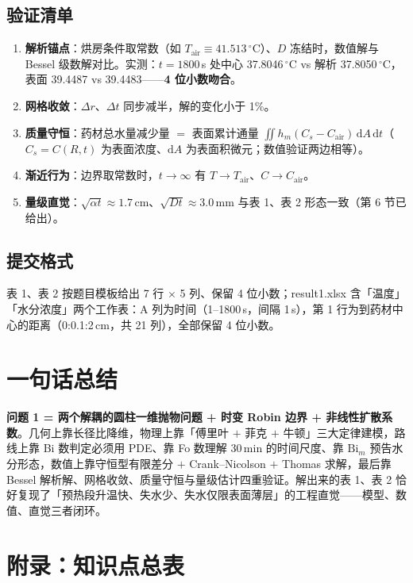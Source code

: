 \documentclass[12pt,a4paper]{ctexart}
\begin{document}
\subsection{验证清单}

\begin{enumerate}[leftmargin=2.5em]
\item \textbf{解析锚点}：烘房条件取常数（如 $T_{\mathrm{air}}\equiv41.513\,^\circ$C）、$D$ 冻结时，数值解与 Bessel 级数解对比。实测：$t=1800$\,s 处中心 37.8046\,$^\circ$C vs 解析 37.8050\,$^\circ$C，表面 39.4487 vs 39.4483——\textbf{4 位小数吻合}。
\item \textbf{网格收敛}：$\Delta r$、$\Delta t$ 同步减半，解的变化小于 1\%。
\item \textbf{质量守恒}：药材总水量减少量 $=$ 表面累计通量 $\iint h_m(C_s-C_{\mathrm{air}})\,\mathrm{d}A\,\mathrm{d}t$（$C_s=C(R,t)$ 为表面浓度、$\mathrm{d}A$ 为表面积微元；数值验证两边相等）。
\item \textbf{渐近行为}：边界取常数时，$t\to\infty$ 有 $T\to T_{\mathrm{air}}$、$C\to C_{\mathrm{air}}$。
\item \textbf{量级直觉}：$\sqrt{\alpha t}\approx1.7$\,cm、$\sqrt{Dt}\approx3.0$\,mm 与表 1、表 2 形态一致（第 6 节已给出）。
\end{enumerate}

\subsection{提交格式}

表 1、表 2 按题目模板给出 7 行 $\times$ 5 列、保留 4 位小数；result1.xlsx 含「温度」「水分浓度」两个工作表：A 列为时间（1--1800\,s，间隔 1\,s），第 1 行为到药材中心的距离（0:0.1:2\,cm，共 21 列），全部保留 4 位小数。

\section{一句话总结}

\textbf{问题 1 = 两个解耦的圆柱一维抛物问题 + 时变 Robin 边界 + 非线性扩散系数}。几何上靠长径比降维，物理上靠「傅里叶 $+$ 菲克 $+$ 牛顿」三大定律建模，路线上靠 Bi 数判定必须用 PDE、靠 Fo 数理解 30\,min 的时间尺度、靠 $\mathrm{Bi}_m$ 预告水分形态，数值上靠守恒型有限差分 $+$ Crank--Nicolson $+$ Thomas 求解，最后靠 Bessel 解析解、网格收敛、质量守恒与量级估计四重验证。解出来的表 1、表 2 恰好复现了「预热段升温快、失水少、失水仅限表面薄层」的工程直觉——模型、数值、直觉三者闭环。

\section*{附录：知识点总表}
\end{document}
